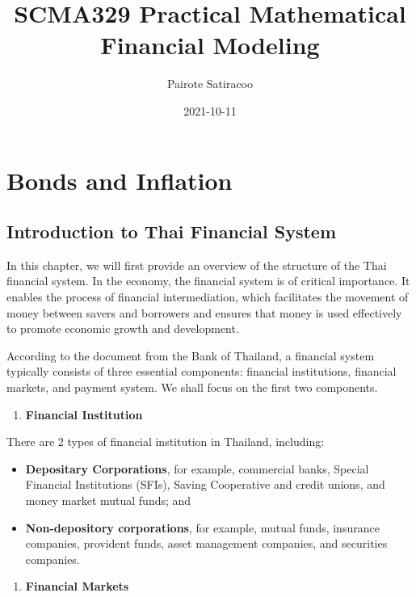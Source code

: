 \documentclass[landscape, 20pt]{extreport}
\title{SCMA329 Practical Mathematical Financial Modeling}
\author{Pairote Satiracoo}
\date{2021-10-11}
\providecommand{\tightlist}{%
  \setlength{\itemsep}{0pt}\setlength{\parskip}{0pt}}
\theoremstyle{definition}
\theoremstyle{definition}
\theoremstyle{definition}
\theoremstyle{definition}
\theoremstyle{remark}
\begin{document}
\maketitle

\setcounter{chapter}{1}
\hypertarget{bonds-and-inflation}{%
\chapter{Bonds and Inflation}\label{bonds-and-inflation}}



\hypertarget{introduction-to-thai-financial-system}{%
\section{Introduction to Thai Financial
System}\label{introduction-to-thai-financial-system}}

In this chapter, we will first provide an overview of the structure of
the Thai financial system. In the economy, the financial system is of
critical importance. It enables the process of financial intermediation,
which facilitates the movement of money between savers and borrowers and
ensures that money is used effectively to promote economic growth and
development.

According to the document from the Bank of Thailand, a financial system
typically consists of three essential components: financial
institutions, financial markets, and payment system. We shall focus on the first two components.

\begin{enumerate}
\def\labelenumi{\arabic{enumi}.}
\tightlist
\item
  \textbf{Financial Institution}
\end{enumerate}

There are 2 types of financial institution in Thailand, including:

\begin{itemize}
\item \textbf{Depositary Corporations}, for example, commercial banks, Special Financial Institutions (SFIs), Saving Cooperative and credit unions, and money market mutual funds; and
    
\item \textbf{Non-depository corporations}, for example, mutual funds, insurance companies, provident funds, asset management companies, and securities companies.
 
\end{itemize}
\newpage
\begin{enumerate}
\def\labelenumi{\arabic{enumi}.}
\setcounter{enumi}{1}
\tightlist
\item
  \textbf{Financial Markets}
\end{enumerate}
\end{document}

